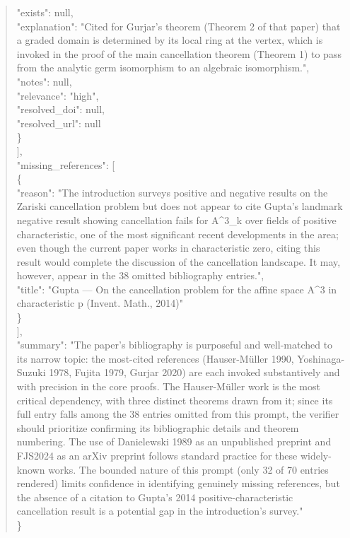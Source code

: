 \documentclass[11pt]{article}
\begin{document}
\begin{quote}
      "exists": null,\\
      "explanation": "Cited for Gurjar's theorem (Theorem 2 of that paper) that a graded domain is determined by its local ring at the vertex, which is invoked in the proof of the main cancellation theorem (Theorem 1) to pass from the analytic germ isomorphism to an algebraic isomorphism.",\\
      "notes": null,\\
      "relevance": "high",\\
      "resolved\_doi": null,\\
      "resolved\_url": null\\
    \}\\
  ],\\
  "missing\_references": [\\
    \{\\
      "reason": "The introduction surveys positive and negative results on the Zariski cancellation problem but does not appear to cite Gupta's landmark negative result showing cancellation fails for A\^{}3\_k over fields of positive characteristic, one of the most significant recent developments in the area; even though the current paper works in characteristic zero, citing this result would complete the discussion of the cancellation landscape. It may, however, appear in the 38 omitted bibliography entries.",\\
      "title": "Gupta --- On the cancellation problem for the affine space A\^{}3 in characteristic p (Invent. Math., 2014)"\\
    \}\\
  ],\\
  "summary": "The paper's bibliography is purposeful and well-matched to its narrow topic: the most-cited references (Hauser-Müller 1990, Yoshinaga-Suzuki 1978, Fujita 1979, Gurjar 2020) are each invoked substantively and with precision in the core proofs. The Hauser-Müller work is the most critical dependency, with three distinct theorems drawn from it; since its full entry falls among the 38 entries omitted from this prompt, the verifier should prioritize confirming its bibliographic details and theorem numbering. The use of Danielewski 1989 as an unpublished preprint and FJS2024 as an arXiv preprint follows standard practice for these widely-known works. The bounded nature of this prompt (only 32 of 70 entries rendered) limits confidence in identifying genuinely missing references, but the absence of a citation to Gupta's 2014 positive-characteristic cancellation result is a potential gap in the introduction's survey."\\
\}\\
\end{quote}
\end{document}
